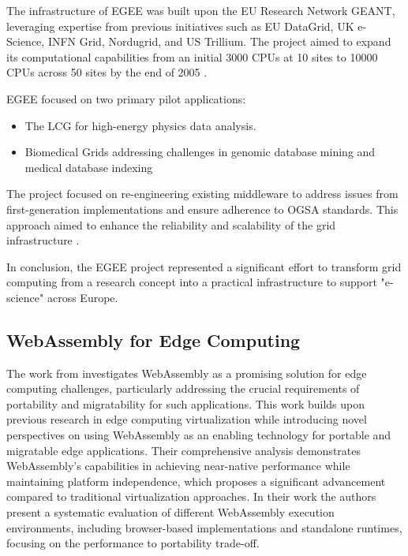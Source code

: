 The infrastructure of \ac{EGEE} was built upon the EU Research Network GEANT, leveraging expertise from previous initiatives such as EU DataGrid, UK e-Science, INFN Grid, Nordugrid, and US Trillium. The project aimed to expand its computational capabilities from an initial 3000 CPUs at 10 sites to 10000 CPUs across 50 sites by the end of 2005 \cite{relatedwork:egee}.

\ac{EGEE} focused on two primary pilot applications: 
\begin{itemize}
  \item The \ac{LCG} for high-energy physics data analysis.
  \item Biomedical Grids addressing challenges in genomic database mining and medical database indexing
\end{itemize}
The project focused on re-engineering existing middleware to address issues from first-generation implementations and ensure adherence to \ac{OGSA} standards. This approach aimed to enhance the reliability and scalability of the grid infrastructure \cite{relatedwork:egee}.

In conclusion, the \ac{EGEE} project represented a significant effort to transform grid computing from a research concept into a practical infrastructure to support "e-science" across Europe.

\subsection{WebAssembly for Edge Computing}
\label{subsec:background:related_work:wasmedgecomputing}
The work from \citeauthor{relatedwork:wasmedgecomputing} \cite{relatedwork:wasmedgecomputing} investigates WebAssembly as a promising solution for edge computing challenges, particularly addressing the crucial requirements of portability and migratability for such applications. This work builds upon previous research in edge computing virtualization while introducing novel perspectives on using WebAssembly as an enabling technology for portable and migratable edge applications. Their comprehensive analysis demonstrates WebAssembly's capabilities in achieving near-native performance while maintaining platform independence, which proposes a significant advancement compared to traditional virtualization approaches. In their work the authors present a systematic evaluation of different WebAssembly execution environments, including browser-based implementations and standalone runtimes, focusing on the performance to portability trade-off. 

